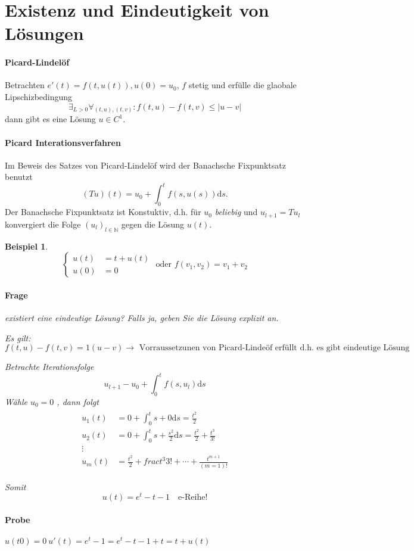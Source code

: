 \documentclass[11pt]{article}
\newcommand{\dd}{\mathrm{d}}
\newcommand{\NN}{\mathbb{N}}
\newcounter{myCounter}[section]
\newtheorem{Bsp}[myCounter]{Beispiel}
\begin{document}
\section{Existenz und Eindeutigkeit von L\"osungen}

\paragraph{Picard-Lindel\"of}
Betrachten $e'(t) = f(t,u(t)), u(0) = u_0$, $f$ stetig und erf\"ulle die glaobale
Lipschizbedingung \[ \exists_{L>0} \forall_{(t,u),(t,v)} : f(t,u) - f(t,v) \leq
|u-v| \] dann gibt es eine L\"osung $u \in C^1$.

\paragraph{Picard Interationsverfahren}
Im Beweis des Satzes von Picard-Lindel\"of wird der Banachsche Fixpunktsatz
benutzt \[ (Tu)(t) = u_0 + \int_0^t f(s,u(s)) \dd s. \]
Der Banachsche Fixpunktsatz ist Konstuktiv, d.h. f\"ur $u_0$ \emph{beliebig}
und $u_{l+1} = Tu_l$ konvergiert die Folge $(u_l)_{l \in \NN}$ gegen die
L\"osung $u(t)$.

\begin{Bsp}
  \[ \left\{\begin{aligned} u(t)&=t+ u(t) \\ u(0) &= 0 \end{aligned} \right.
    \text{ oder } f(v_1,v_2) = v_1 + v_2 \]
  \paragraph{Frage} existiert eine eindeutige L\"osung? Falls ja, geben Sie die
  L\"osung explizit an.

  Es gilt: $f(t,u) - f(t,v) = 1 (u - v) \rightarrow \text{ Vorraussetzunen von
  Picard-Linde\"of erf\"ullt d.h. es gibt eindeutige L\"osung }$

  Betrachte Iterationsfolge \[
    u_{l+1} - u_0 + \int_0^t f(s,u_l) \dd s \]
    W\"ahle $u_ 0 = 0$ , dann folgt
  \begin{align*}
    \begin{matrix}
      u_1(t) &= 0 + \int_0^t s + 0 \dd s = \frac{t^2}{2} \\
      u_2(t) &= 0 + \int_0^t s + \frac{s^2}{2} \dd s = \frac{t^2}{2} + \frac{t^3}{3!} \\
      \vdots \\
      u_m(t) &= \frac{t^2}{2} + frac{t^3}{3!} + \dotsb + \frac{t^{m+1}}{(m=1)!}
    \end{matrix}
  \end{align*}

  Somit \[ u(t) = e^t - t - 1 \quad \text {e-Reihe!} \]

  \paragraph{Probe} $u(t0) = 0 \ u'(t) = e^t - 1 = e^t - t - 1 + t = t +
  u(t)$
\end{Bsp}
\end{document}
